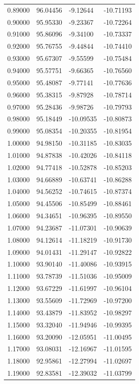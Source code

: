 \begin{table}
\begin{tabular}{llll}
0.89000 & 96.04456 & -9.12644 & -10.71193 \\
0.90000 & 95.95330 & -9.23367 & -10.72264 \\
0.91000 & 95.86096 & -9.34100 & -10.73337 \\
0.92000 & 95.76755 & -9.44844 & -10.74410 \\
0.93000 & 95.67307 & -9.55599 & -10.75484 \\
0.94000 & 95.57751 & -9.66365 & -10.76560 \\
0.95000 & 95.48087 & -9.77141 & -10.77636 \\
0.96000 & 95.38315 & -9.87928 & -10.78714 \\
0.97000 & 95.28436 & -9.98726 & -10.79793 \\
0.98000 & 95.18449 & -10.09535 & -10.80873 \\
0.99000 & 95.08354 & -10.20355 & -10.81954 \\
1.00000 & 94.98150 & -10.31185 & -10.83035 \\
1.01000 & 94.87838 & -10.42026 & -10.84118 \\
1.02000 & 94.77418 & -10.52878 & -10.85203 \\
1.03000 & 94.66889 & -10.63741 & -10.86288 \\
1.04000 & 94.56252 & -10.74615 & -10.87374 \\
1.05000 & 94.45506 & -10.85499 & -10.88461 \\
1.06000 & 94.34651 & -10.96395 & -10.89550 \\
1.07000 & 94.23687 & -11.07301 & -10.90639 \\
1.08000 & 94.12614 & -11.18219 & -10.91730 \\
1.09000 & 94.01431 & -11.29147 & -10.92822 \\
1.10000 & 93.90140 & -11.40086 & -10.93915 \\
1.11000 & 93.78739 & -11.51036 & -10.95009 \\
1.12000 & 93.67229 & -11.61997 & -10.96104 \\
1.13000 & 93.55609 & -11.72969 & -10.97200 \\
1.14000 & 93.43879 & -11.83952 & -10.98297 \\
1.15000 & 93.32040 & -11.94946 & -10.99395 \\
1.16000 & 93.20090 & -12.05951 & -11.00495 \\
1.17000 & 93.08031 & -12.16967 & -11.01595 \\
1.18000 & 92.95861 & -12.27994 & -11.02697 \\
1.19000 & 92.83581 & -12.39032 & -11.03799 \\

\end{tabular}
\end{table}
